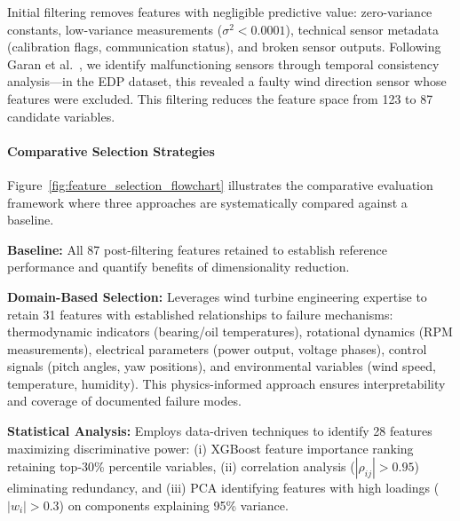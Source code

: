 \documentclass[12pt]{article}
\begin{document}
Initial filtering removes features with negligible predictive value: zero-variance constants, low-variance measurements ($\sigma^2 < 0.0001$), technical sensor metadata (calibration flags, communication status), and broken sensor outputs. Following Garan et al.~\cite{1}, we identify malfunctioning sensors through temporal consistency analysis—in the EDP dataset, this revealed a faulty wind direction sensor whose features were excluded. This filtering reduces the feature space from 123 to 87 candidate variables.

\paragraph{Comparative Selection Strategies}

Figure~\ref{fig:feature_selection_flowchart} illustrates the comparative evaluation framework where three approaches are systematically compared against a baseline.


\textbf{Baseline:} All 87 post-filtering features retained to establish reference performance and quantify benefits of dimensionality reduction.

\textbf{Domain-Based Selection:} Leverages wind turbine engineering expertise to retain 31 features with established relationships to failure mechanisms: thermodynamic indicators (bearing/oil temperatures), rotational dynamics (RPM measurements), electrical parameters (power output, voltage phases), control signals (pitch angles, yaw positions), and environmental variables (wind speed, temperature, humidity). This physics-informed approach ensures interpretability and coverage of documented failure modes.

\textbf{Statistical Analysis:} Employs data-driven techniques to identify 28 features maximizing discriminative power: (i) XGBoost feature importance ranking retaining top-30\% percentile variables, (ii) correlation analysis ($|\rho_{ij}| > 0.95$) eliminating redundancy, and (iii) PCA identifying features with high loadings ($|w_i| > 0.3$) on components explaining 95\% variance.
\end{document}
